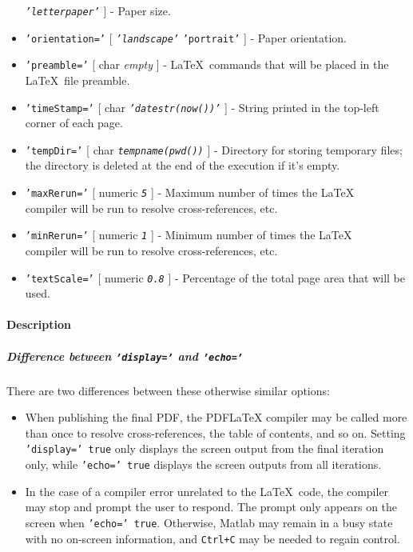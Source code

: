 \begin{itemize}
  \emph{\texttt{'letterpaper'}} {]} - Paper size.
\item
  \texttt{'orientation='} {[} \emph{\texttt{'landscape'}} \textbar{}
  \texttt{'portrait'} {]} - Paper orientation.
\item
  \texttt{'preamble='} {[} char \textbar{} \emph{empty} {]} -
  \LaTeX~commands that will be placed in the \LaTeX~file preamble.
\item
  \texttt{'timeStamp='} {[} char \textbar{}
  \emph{\texttt{'datestr(now())'}} {]} - String printed in the top-left
  corner of each page.
\item
  \texttt{'tempDir='} {[} char \textbar{} \emph{\texttt{tempname(pwd())}}
  {]} - Directory for storing temporary files; the directory is deleted
  at the end of the execution if it's empty.
\item
  \texttt{'maxRerun='} {[} numeric \textbar{} \emph{\texttt{5}} {]} -
  Maximum number of times the \LaTeX\\compiler will be run to resolve
  cross-references, etc.
\item
  \texttt{'minRerun='} {[} numeric \textbar{} \emph{\texttt{1}} {]} -
  Minimum number of times the \LaTeX\\compiler will be run to resolve
  cross-references, etc.
\item
  \texttt{'textScale='} {[} numeric \textbar{} \emph{\texttt{0.8}} {]} -
  Percentage of the total page area that will be used.
\end{itemize}

\paragraph{Description}

\subparagraph{Difference between \texttt{'display='} and
\texttt{'echo='}}

There are two differences between these otherwise similar options:

\begin{itemize}
\item
  When publishing the final PDF, the PDFLaTeX compiler may be called
  more than once to resolve cross-references, the table of contents, and
  so on. Setting \texttt{'display=' true} only displays the screen
  output from the final iteration only, while \texttt{'echo=' true}
  displays the screen outputs from all iterations.
\item
  In the case of a compiler error unrelated to the \LaTeX~code, the
  compiler may stop and prompt the user to respond. The prompt only
  appears on the screen when \texttt{'echo=' true}. Otherwise, Matlab
  may remain in a busy state with no on-screen information, and
  \texttt{Ctrl+C} may be needed to regain control.
\end{itemize}

